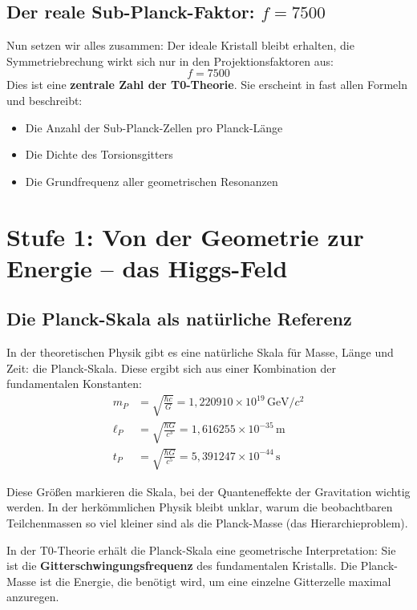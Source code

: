 	\subsection{Der reale Sub-Planck-Faktor: \(f = 7500\)}
	Nun setzen wir alles zusammen: Der ideale Kristall bleibt erhalten, die Symmetriebrechung wirkt sich nur in den Projektionsfaktoren aus:
	\begin{equation}
		\boxed{f = 7500}
	\end{equation}
	Dies ist eine \textbf{zentrale Zahl der T0-Theorie}. Sie erscheint in fast allen Formeln und beschreibt:
	\begin{itemize}
		\item Die Anzahl der Sub-Planck-Zellen pro Planck-Länge
		\item Die Dichte des Torsionsgitters
		\item Die Grundfrequenz aller geometrischen Resonanzen
	\end{itemize}
	\section{Stufe 1: Von der Geometrie zur Energie -- das Higgs-Feld}
	
	\subsection{Die Planck-Skala als natürliche Referenz}
	
	In der theoretischen Physik gibt es eine natürliche Skala für Masse, Länge und Zeit: die Planck-Skala. Diese ergibt sich aus einer Kombination der fundamentalen Konstanten:
	\begin{align}
		m_P &= \sqrt{\frac{\hbar c}{G}} = 1{,}220910 \times 10^{19}\,\text{GeV}/c^2 \\
		\ell_P &= \sqrt{\frac{\hbar G}{c^3}} = 1{,}616255 \times 10^{-35}\,\text{m} \\
		t_P &= \sqrt{\frac{\hbar G}{c^5}} = 5{,}391247 \times 10^{-44}\,\text{s}
	\end{align}
	
	Diese Größen markieren die Skala, bei der Quanteneffekte der Gravitation wichtig werden. In der herkömmlichen Physik bleibt unklar, warum die beobachtbaren Teilchenmassen so viel kleiner sind als die Planck-Masse (das Hierarchieproblem).
	
	In der T0-Theorie erhält die Planck-Skala eine geometrische Interpretation: Sie ist die \textbf{Gitterschwingungsfrequenz} des fundamentalen Kristalls. Die Planck-Masse ist die Energie, die benötigt wird, um eine einzelne Gitterzelle maximal anzuregen.
	
